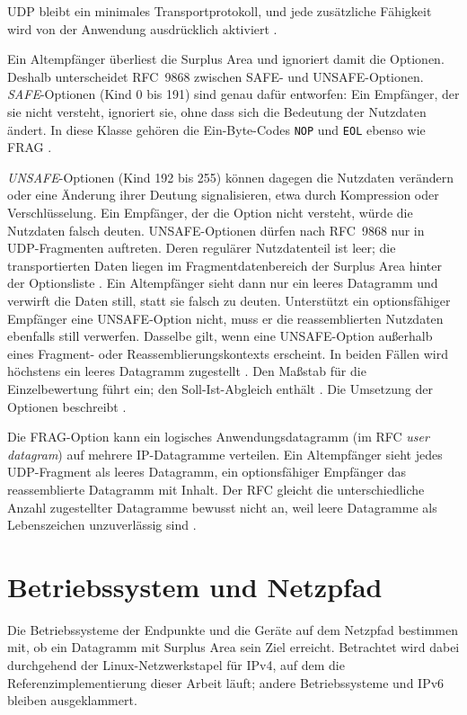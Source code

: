 UDP bleibt ein minimales Transportprotokoll, und jede zusätzliche Fähigkeit wird von der Anwendung ausdrücklich
aktiviert \cite[Sec.~6]{rfc9868}.

Ein Altempfänger überliest die Surplus Area und ignoriert damit die Optionen. Deshalb unterscheidet RFC~9868 zwischen
SAFE- und UNSAFE-Optionen. \textit{SAFE}-Optionen (Kind 0 bis 191) sind genau dafür entworfen: Ein Empfänger, der sie
nicht versteht, ignoriert sie, ohne dass sich die Bedeutung der Nutzdaten ändert. In diese Klasse gehören die
Ein-Byte-Codes \texttt{NOP} und \texttt{EOL} ebenso wie FRAG \cite[Sec.~10 und 11]{rfc9868}.

\textit{UNSAFE}-Optionen (Kind 192 bis 255) können dagegen die Nutzdaten verändern oder eine Änderung ihrer Deutung
signalisieren, etwa durch Kompression oder Verschlüsselung. Ein Empfänger, der die Option nicht versteht, würde die
Nutzdaten falsch deuten. UNSAFE-Optionen dürfen nach RFC~9868 nur in UDP-Fragmenten auftreten. Deren regulärer
Nutzdatenteil ist leer; die transportierten Daten liegen im Fragmentdatenbereich der Surplus Area hinter der
Optionsliste \cite[Sec.~11.4]{rfc9868}. Ein Altempfänger sieht dann nur ein leeres Datagramm und verwirft die Daten
still, statt sie falsch zu deuten. Unterstützt ein optionsfähiger Empfänger eine UNSAFE-Option nicht, muss er die
reassemblierten Nutzdaten ebenfalls still verwerfen. Dasselbe gilt, wenn eine UNSAFE-Option außerhalb eines Fragment-
oder Reassemblierungskontexts erscheint. In beiden Fällen wird höchstens ein leeres Datagramm zugestellt \cite[Sec.~10,
12 und 14]{rfc9868}. Den Maßstab für die Einzelbewertung führt  ein; den
Soll-Ist-Abgleich enthält . Die Umsetzung der Optionen beschreibt .

Die FRAG-Option kann ein logisches Anwendungsdatagramm (im RFC \textit{user datagram}) auf mehrere IP-Datagramme
verteilen. Ein Altempfänger sieht jedes UDP-Fragment als leeres Datagramm, ein optionsfähiger Empfänger das
reassemblierte Datagramm mit Inhalt. Der RFC gleicht die unterschiedliche Anzahl zugestellter Datagramme bewusst nicht
an, weil leere Datagramme als Lebenszeichen unzuverlässig sind \cite[Sec.~6 und 18]{rfc9868}.

\section{Betriebssystem und Netzpfad}
\label{sec:netzpfad}

Die Betriebssysteme der Endpunkte und die Geräte auf dem Netzpfad bestimmen mit, ob ein Datagramm mit Surplus Area sein
Ziel erreicht. Betrachtet wird dabei durchgehend der Linux-Netzwerkstapel für IPv4, auf dem die Referenzimplementierung
dieser Arbeit läuft; andere Betriebssysteme und IPv6 bleiben ausgeklammert.


